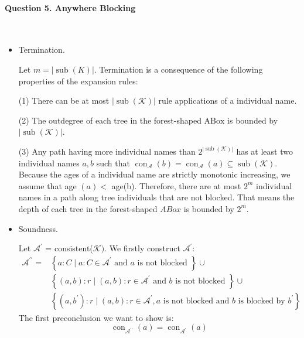 \documentclass[12pt]{article}
\begin{document}
    \paragraph{Question 5. Anywhere Blocking}~{}
    \\
    \begin{itemize}
        \item Termination. \par
        Let $m = |\operatorname{sub}(K)|$. Termination is a consequence of the following properties of the expansion rules: \par
        (1) There can be at most $|\operatorname{sub}(\mathcal{K})|$ rule applications of a individual name. \par
        (2) The outdegree of each tree in the forest-shaped $\mathrm{ABox}$ is bounded by $|\operatorname{sub}(\mathcal{K})|$. \par
        (3) Any path having more individual names than $2^{|\operatorname{sub}(\mathcal{K})|}$ has at least two individual names $a, b$ such that $\operatorname{con}_{\mathcal{A}}(b)=\operatorname{con}_{\mathcal{A}}(a) \subseteq \operatorname{sub}(\mathcal{K})$. Because the ages of a individual name are strictly monotonic increasing, we assume that age $(a)<$ age(b). Therefore, there are at most $2^m$ individual names in a path along tree individuals that are not blocked. That means the depth of each tree in the forest-shaped $ABox$ is bounded by $2^m$.
        \item Soundness. \par
        Let $\mathcal{A}^{'}$ = consistent($\mathcal{K})$. We firstly construct $\mathcal{A}^{'}$:
        \begin{equation}
            \begin{aligned} \mathcal{A}^{\prime \prime}= & \left\{a: C \mid a: C \in \mathcal{A}^{\prime} \text { and } a \text { is not blocked }\right\} \cup \\ & \left\{(a, b): r \mid(a, b): r \in \mathcal{A}^{\prime} \text { and } b \text { is not blocked }\right\} \cup \\ & \left\{\left(a, b^{\prime}\right): r \mid(a, b): r \in \mathcal{A}^{\prime}, a \text { is not blocked and } b \text { is blocked by } b^{\prime}\right\}\end{aligned}
            \nonumber
        \end{equation}
        The first preconclusion we want to show is: 
        \begin{equation}
            \operatorname{con}_{\mathcal{A}^{\prime\prime}}(a)=\operatorname{con}_{\mathcal{A}^{\prime}}(a)

\end{equation}
\end{itemize}
\end{document}
